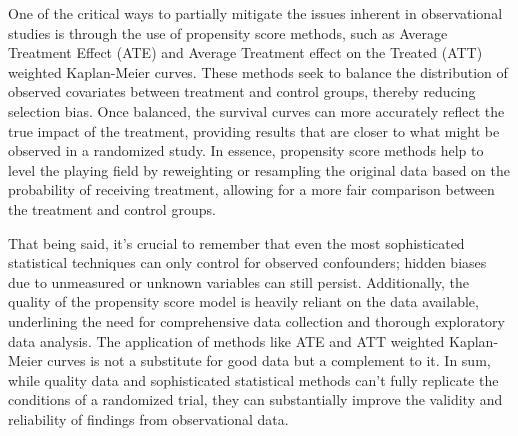 One of the critical ways to partially mitigate the issues inherent in observational studies is through the use of propensity score methods, such as Average Treatment Effect (ATE) and Average Treatment effect on the Treated (ATT) weighted Kaplan-Meier curves. These methods seek to balance the distribution of observed covariates between treatment and control groups, thereby reducing selection bias. Once balanced, the survival curves can more accurately reflect the true impact of the treatment, providing results that are closer to what might be observed in a randomized study. In essence, propensity score methods help to level the playing field by reweighting or resampling the original data based on the probability of receiving treatment, allowing for a more fair comparison between the treatment and control groups.

That being said, it's crucial to remember that even the most sophisticated statistical techniques can only control for observed confounders; hidden biases due to unmeasured or unknown variables can still persist. Additionally, the quality of the propensity score model is heavily reliant on the data available, underlining the need for comprehensive data collection and thorough exploratory data analysis. The application of methods like ATE and ATT weighted Kaplan-Meier curves is not a substitute for good data but a complement to it. In sum, while quality data and sophisticated statistical methods can't fully replicate the conditions of a randomized trial, they can substantially improve the validity and reliability of findings from observational data.



